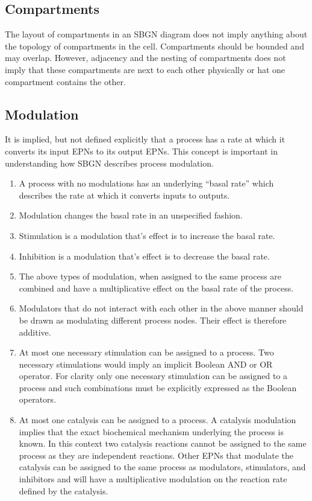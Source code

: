 \subsection{Compartments}

The layout of compartments in an SBGN diagram does not imply anything
about the topology of compartments in the cell. Compartments should be
bounded and may overlap. However, adjacency and the nesting of
compartments does not imply that these compartments are next to each
other physically or hat one compartment contains the other.

\subsection{Modulation}

It is implied, but not defined explicitly that a process has a rate at
which it converts its input EPNs to its output EPNs. This concept is
important in understanding how SBGN describes process modulation.

\begin{enumerate}
\item A process with no modulations has an underlying ``basal rate''
  which describes the rate at which it converts inputs to outputs.
\item Modulation changes the basal rate in an unspecified fashion.
\item Stimulation is a modulation that's effect is to increase the basal rate.
\item Inhibition is a modulation that's effect is to decrease the basal rate.
\item The above types of modulation, when assigned to the same process are combined and have a multiplicative effect on the basal rate of the process.
\item Modulators that do not interact with each other in the above manner should be drawn as modulating different process nodes. Their effect is therefore additive.
\item At most one necessary stimulation can be assigned to a process. Two necessary stimulations
  would imply an implicit Boolean AND or OR operator. For clarity only
  one necessary stimulation can be assigned to a process and such combinations must be
  explicitly expressed as the Boolean operators.
\item At most one catalysis can be assigned to a process. A catalysis
  modulation implies that the exact biochemical mechanism underlying
  the process is known. In this context two catalysis reactions cannot
  be assigned to the same process as they are
  independent reactions. Other EPNs that modulate the catalysis can be
  assigned to the same process as modulators, stimulators, and
  inhibitors and will have a multiplicative modulation on the reaction
  rate defined by the catalysis.
\end{enumerate}

